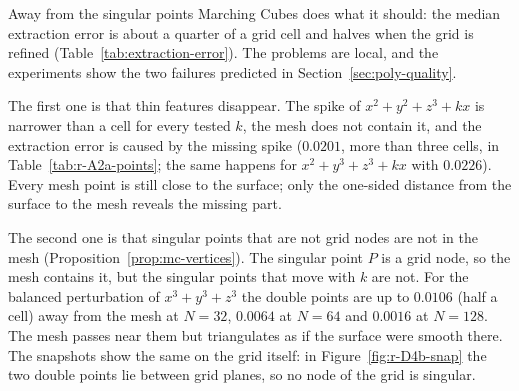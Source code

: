 \documentclass[12pt, a4paper, oneside]{book}
\theoremstyle{plain}
\theoremstyle{definition}
\theoremstyle{remark}
\theoremstyle{definition}
\begin{document}
Away from the singular points Marching Cubes \cite{lorensen1998marching,wenger2013} does what it should: the median extraction error is about a quarter of a grid cell and halves when the grid is refined (Table~\ref{tab:extraction-error}). The problems are local, and the experiments show the two failures predicted in Section~\ref{sec:poly-quality}.

The first one is that thin features disappear. The spike of $x^2+y^2+z^3+kx$ is narrower than a cell for every tested $k$, the mesh does not contain it, and the extraction error is caused by the missing spike ($0.0201$, more than three cells, in Table~\ref{tab:r-A2a-points}; the same happens for $x^2+y^3+z^3+kx$ with $0.0226$). Every mesh point is still close to the surface; only the one-sided distance from the surface to the mesh reveals the missing part.

The second one is that singular points that are not grid nodes are not in the mesh (Proposition~\ref{prop:mc-vertices}). The singular point $P$ is a grid node, so the mesh contains it, but the singular points that move with $k$ are not. For the balanced perturbation of $x^3+y^3+z^3$ the double points are up to $0.0106$ (half a cell) away from the mesh at $N=32$, $0.0064$ at $N=64$ and $0.0016$ at $N=128$. The mesh passes near them but triangulates as if the surface were smooth there. The snapshots show the same on the grid itself: in Figure~\ref{fig:r-D4b-snap} the two double points lie between grid planes, so no node of the grid is singular.
\end{document}
